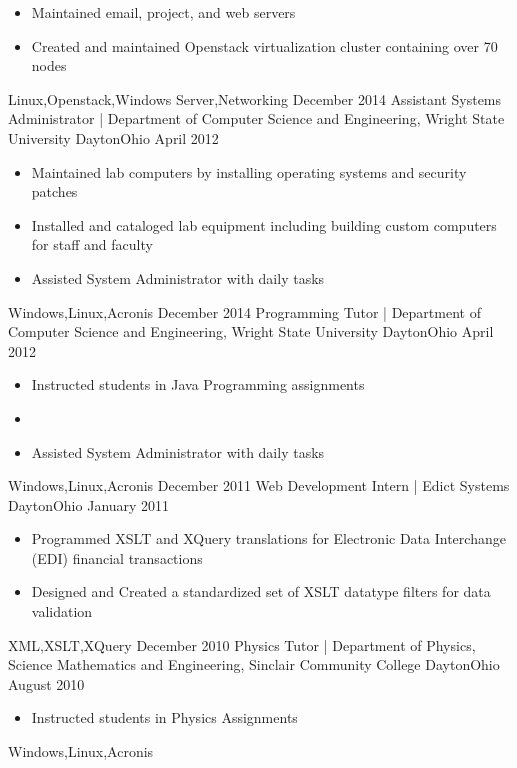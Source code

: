 \begin{experiences}
{\begin{itemize}
          \item Maintained email, project, and web servers
          \item Created and maintained Openstack virtualization cluster containing over 70 nodes
      \end{itemize}
  }
  {Linux,Openstack,Windows Server,Networking}
  \emptySeparator
  \experience
  {December 2014}     { Assistant Systems Administrator | Department of Computer Science and Engineering, Wright State University }{Dayton}{Ohio}
  {April 2012}    {
      \begin{itemize}
          \item Maintained lab computers by installing operating systems and security patches
          \item Installed and cataloged lab equipment including building custom computers for staff and faculty
          \item Assisted System Administrator with daily tasks
      \end{itemize}
  }
  {Windows,Linux,Acronis}
  \emptySeparator
  \experience
    {December 2014}     { Programming Tutor | Department of Computer Science and Engineering, Wright State University }{Dayton}{Ohio}
    {April 2012}    {
      \begin{itemize}
        \item Instructed students in Java Programming assignments
        \item
        \item Assisted System Administrator with daily tasks
      \end{itemize}
    }
    {Windows,Linux,Acronis}
  \emptySeparator
  \experience
  {December 2011}     { Web Development Intern | Edict Systems }{Dayton}{Ohio}
  {January 2011}    {
      \begin{itemize}
          \item Programmed XSLT and XQuery translations for Electronic Data Interchange (EDI) financial transactions
          \item Designed and Created a standardized set of XSLT datatype filters for data validation
      \end{itemize}
  }
  {XML,XSLT,XQuery}
  \emptySeparator
  \experience
  {December 2010}     { Physics Tutor | Department of Physics, Science Mathematics and Engineering, Sinclair Community College }{Dayton}{Ohio}
  {August 2010}    {
      \begin{itemize}
          \item Instructed students in Physics Assignments
      \end{itemize}
  }
  {Windows,Linux,Acronis}


\end{experiences}
